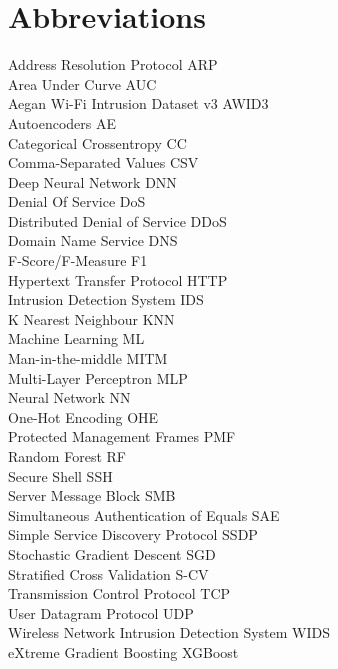 
\section*{Abbreviations}
\large 

Address Resolution Protocol \hfill ARP \\
Area Under Curve \hfill AUC \\
Aegan Wi-Fi Intrusion Dataset v3 \hfill AWID3 \\
Autoencoders \hfill AE \\
Categorical Crossentropy \hfill CC \\
Comma-Separated Values \hfill CSV \\
Deep Neural Network \hfill DNN \\
Denial Of Service \hfill DoS \\
Distributed Denial of Service \hfill DDoS \\
Domain Name Service \hfill DNS \\
F-Score/F-Measure \hfill F1 \\
Hypertext Transfer Protocol \hfill HTTP \\
Intrusion Detection System \hfill IDS \\
K Nearest Neighbour \hfill KNN \\
Machine Learning \hfill ML \\
Man-in-the-middle \hfill MITM \\
Multi-Layer Perceptron \hfill MLP \\
Neural Network \hfill NN \\
One-Hot Encoding \hfill OHE \\
Protected Management Frames \hfill PMF \\
Random Forest \hfill RF \\
Secure Shell \hfill SSH \\
Server Message Block \hfill SMB \\
Simultaneous Authentication of Equals \hfill SAE \\
Simple Service Discovery Protocol \hfill SSDP \\
Stochastic Gradient Descent \hfill SGD \\
Stratified Cross Validation \hfill S-CV \\
Transmission Control Protocol \hfill TCP \\
User Datagram Protocol \hfill UDP \\
Wireless Network Intrusion Detection System \hfill WIDS \\
eXtreme Gradient Boosting \hfill XGBoost \\
\\
